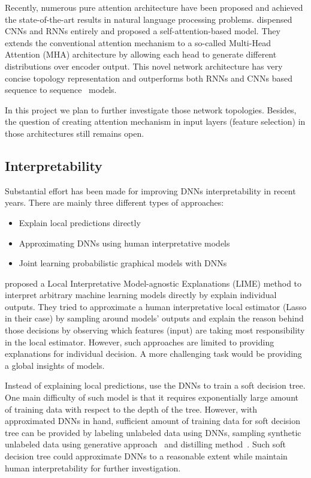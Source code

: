 \documentclass{article} \usepackage{tabularx}
\renewcommand{\citename}{\citet} \renewcommand{\cite}{\citep}
\begin{document}
Recently, numerous pure attention architecture have been proposed
and achieved the state-of-the-art results in natural language
processing problems. \citename{vaswani2017attention} dispensed
CNNs and RNNs entirely and proposed a self-attention-based model.
They extends the conventional attention mechanism to a so-called
Multi-Head Attention (MHA) architecture by allowing each head to
generate different distributions over encoder output. This novel
network architecture has very concise topology representation and
outperforms both RNNs and CNNs based sequence to
sequence~\cite{vaswani2017attention} models.

In this project we plan to further investigate those network
topologies. Besides, the question of creating attention mechanism
in input layers (feature selection) in those architectures still
remains open.

\subsection{Interpretability}
\label{sec:interp}

Substantial effort has been made for improving DNNs
interpretability in recent years. There are mainly three
different types of approaches:

\begin{itemize}
\item Explain local predictions directly
\item Approximating DNNs using human interpretative models
\item Joint learning probabilistic graphical models with DNNs
\end{itemize}

\citename{ribeiro2016should} proposed a Local Interpretative
Model-agnostic Explanations (LIME) method to interpret arbitrary
machine learning models directly by explain individual outputs.
They tried to approximate a human interpretative local estimator
(Lasso in their case) by sampling around models' outputs and
explain the reason behind those decisions by observing which
features (input) are taking most responsibility in the local
estimator. However, such approaches are limited to providing
explanations for individual decision. A more challenging task
would be providing a global insights of models.

Instead of explaining local predictions, \citename{SDT} use the
DNNs to train a soft decision tree. One main difficulty of such
model is that it requires exponentially large amount of training
data with respect to the depth of the tree. However, with
approximated DNNs in hand, sufficient amount of training data for
soft decision tree can be provided by labeling unlabeled data
using DNNs, sampling synthetic unlabeled data using generative
approach~\cite{goodfellow2014generative} and distilling
method~\cite{hinton2015distilling}. Such soft decision tree could
approximate DNNs to a reasonable extent while maintain human
interpretability for further investigation.
\end{document}
